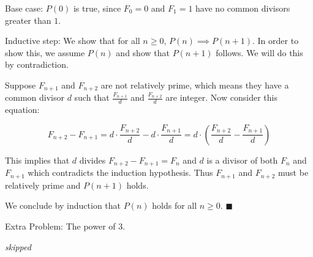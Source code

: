 \documentclass[../main.tex]{subfiles}
\begin{document}
\begin{questions}
\begin{solution}
    Base case: $P(0)$ is true, since $F_0 = 0$ and $F_1 = 1$ have no common divisors greater than $1$.

    Inductive step: We show that for all $n \ge 0$, $P(n) \implies P(n+1)$. In order to show this, we assume $P(n)$ and show that $P(n+1)$ follows. We will do this by contradiction.

    Suppose $F_{n+1}$ and $F_{n+2}$ are not relatively prime, which means they have a common divisor $d$ such that $\frac{F_{n+1}}{d}$ and $\frac{F_{n+2}}{d}$ are integer. Now consider this equation:

    $$
    F_{n+2} - F_{n+1} = d \cdot \frac{F_{n+2}}{d} - d \cdot \frac{F_{n+1}}{d} = d \cdot \left(\frac{F_{n+2}}{d} - \frac{F_{n+1}}{d}\right)
    $$

    This implies that $d$ divides $F_{n+2} - F_{n+1} = F_n$ and $d$ is a divisor of both $F_n$ and $F_{n+1}$ which contradicts the induction hypothesis. Thus $F_{n+1}$ and $F_{n+2}$ must be relatively prime and $P(n+1)$ holds.


    We conclude by induction that $P(n)$ holds for all $n \ge 0$. $\blacksquare$
  \end{solution}

  \question Extra Problem: The power of 3.
  \begin{solution}
    \textit{skipped}
  \end{solution}

\end{questions}
\end{document}

